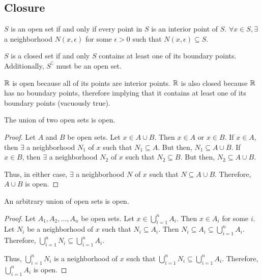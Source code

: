\subsection{Closure}
\begin{definition}
    $S$ is an open set if and only if every point in $S$ is an interior point of $S$. $\forall x \in S, \exists$ a neighborhood $N(x, \epsilon)$ for some $\epsilon > 0$ such that $N(x, \epsilon) \subseteq S$.
\end{definition}

\begin{definition}
    $S$ is a closed set if and only $S$ contains at least one of its boundary points. Additionally, $S^\complement$ must be an open set.
\end{definition}

\begin{remark}[Closure of $\R$]
    $\R$ is open because all of its points are interior points. $\R$ is also closed because $\R$ has no boundary points, therefore implying that it contains at least one of its boundary points (vacuously true).
\end{remark}

\begin{theorem}
    The union of two open sets is open.
\end{theorem}
\begin{proof}
    Let $A$ and $B$ be open sets. Let $x \in A \cup B$. Then $x \in A$ or $x \in B$. If $x \in A$, then $\exists$ a neighborhood $N_1$ of $x$ such that $N_1 \subseteq A$. But then, $N_1 \subseteq A \cup B$. If $x \in B$, then $\exists$ a neighborhood $N_2$ of $x$ such that $N_2 \subseteq B$. But then, $N_2 \subseteq A \cup B$. 
    
    Thus, in either case, $\exists$ a neighborhood $N$ of $x$ such that $N \subseteq A \cup B$. Therefore, $A \cup B$ is open.
\end{proof}

\begin{theorem}
    An arbitrary union of open sets is open.
\end{theorem}
\begin{proof}
    Let $A_1, A_2, \ldots, A_n$ be open sets. Let $x \in \bigcup_{i=1}^n A_i$. Then $x \in A_i$ for some $i$. Let $N_i$ be a neighborhood of $x$ such that $N_i \subseteq A_i$. Then $N_i \subseteq A_i \subseteq \bigcup_{i=1}^n A_i$. Therefore, $\bigcup_{i=1}^n N_i \subseteq \bigcup_{i=1}^n A_i$. 
    
    Thus, $\bigcup_{i=1}^n N_i$ is a neighborhood of $x$ such that $\bigcup_{i=1}^n N_i \subseteq \bigcup_{i=1}^n A_i$. Therefore, $\bigcup_{i=1}^n A_i$ is open.
\end{proof}

